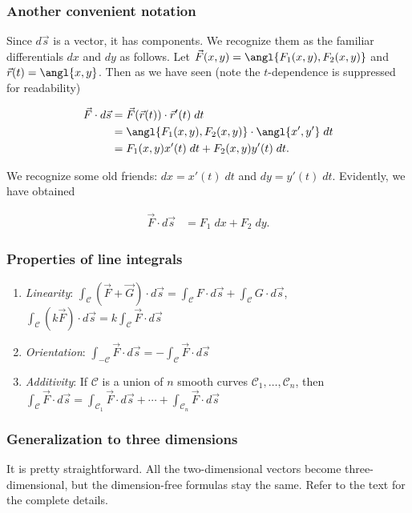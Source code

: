 \documentclass[11pt,ignorenonframetext,aspectratio=169,xcolor={svgnames}]{beamer}
\begin{document}
\begin{frame}\frametitle{Another convenient notation}

Since $d\vec{s}$ is a vector, it has components. We recognize them as
the familiar differentials $dx$ and $dy$ as follows. Let
$\vec{F}(x,y) = \angl{F_1(x,y), F_2(x,y)}$ and
$\vec{r}(t) = \angl{x, y}$. Then as we have seen (note the
$t$-dependence is suppressed for readability)

\begin{align*}
    \vec{F} \cdot d\vec{s} &= \vec{F}(\vec{r}(t)) \cdot \vec{r}'(t) \; dt \\
                           &= \angl{F_1(x, y), F_2(x, y)} \cdot \angl{x', y'} \; dt \\
                           &= F_1(x, y) x'(t) \; dt + F_2(x, y) y'(t) \; dt.
\end{align*}

We recognize some old friends: $dx = x'(t) \; dt$ and
$dy = y'(t) \; dt$. Evidently, we have obtained

\begin{align*}
    \vec{F} \cdot d\vec{s} &= F_1 \; dx + F_2 \; dy.
\end{align*}

\end{frame}

\begin{frame}\frametitle{Properties of line integrals}

\begin{enumerate}
\def\labelenumi{\arabic{enumi}.}
\itemsep1pt\parskip0pt
\item
  \emph{Linearity}:
  $\displaystyle\int_{\mathcal{C}} (\vec{F} + \vec{G}) \cdot d\vec{s} = \int_{\mathcal{C}} F \cdot d\vec{s} + \int_{\mathcal{C}} G \cdot d\vec{s}$,
  $\displaystyle \int_{\mathcal{C}} (k\vec{F}) \cdot d\vec{s} = k\int_{\mathcal{C}} \vec{F} \cdot d\vec{s}$
\item
  \emph{Orientation}:
  $\displaystyle\int_{-\mathcal{C}} \vec{F} \cdot d\vec{s} = -\int_{\mathcal{C}} \vec{F} \cdot d\vec{s}$
\item
  \emph{Additivity}: If $\mathcal{C}$ is a union of $n$ smooth curves
  $\mathcal{C}_1, \ldots, \mathcal{C}_n$, then
  $\displaystyle \int_{\mathcal{C}} \vec{F} \cdot d\vec{s} = \int_{\mathcal{C}_1} \vec{F} \cdot d\vec{s} + \cdots + \int_{\mathcal{C}_n} \vec{F} \cdot d\vec{s}$
\end{enumerate}

\end{frame}

\begin{frame}\frametitle{Generalization to three dimensions}

It is pretty straightforward. All the two-dimensional vectors become
three-dimensional, but the dimension-free formulas stay the same. Refer
to the text for the complete details.

\end{frame}
\end{document}
